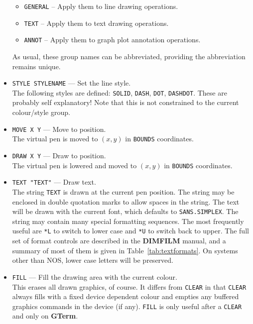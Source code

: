\documentclass[a4paper,twoside,11pt]{article}
\newcommand{\textttc}[1]{\texttt{\textcolor{OurRed}{#1}}}
\begin{document}
\begin{itemize}
\begin{itemize}
	\item \textttc{GENERAL} -- Apply them to line drawing operations.
	\item \textttc{TEXT} -- Apply them to text drawing operations.
	\item \textttc{ANNOT} -- Apply them to graph plot annotation operations.
	\end{itemize}
	As usual, these group names can be abbreviated, providing the abbreviation
	remains unique.
\item \textttc{STYLE STYLENAME} --- Set the line style.\\
   The following styles are defined: \texttt{SOLID}, \texttt{DASH},
   \texttt{DOT}, \texttt{DASHDOT}. These are
   probably self explanatory! Note that this is not constrained to the current
   colour/style group.
\item \textttc{MOVE X Y} --- Move to position.\\
   The virtual pen is moved to $(x,y)$ in \texttt{BOUNDS} coordinates.
\item \textttc{DRAW X Y} --- Draw to position.\\
   The virtual pen is lowered and moved to $(x,y)$ in \texttt{BOUNDS} coordinates.
\item \textttc{TEXT "TEXT"} --- Draw text.\\
   The string \texttt{TEXT} is drawn at the current pen position. The string may be enclosed
   in double quotation marks to allow spaces in the string. The text will be drawn
   with the current font, which defaults to \texttt{SANS.SIMPLEX}. The string may contain many special
   formatting sequences. The most frequently useful are \texttt{*L} to switch to lower case
   and \texttt{*U} to switch back to upper. The full set of format controls are described in
   the \textbf{DIMFILM} manual, and a summary of most of them is given in Table~\ref{tab:textformats}.
   On systems other than NOS, lower case letters will be preserved.
\item \textttc{FILL} --- Fill the drawing area with the current colour.\\
   This erases all drawn graphics, of course. It differs from
   \texttt{CLEAR} in that \texttt{CLEAR} always fills with a fixed
   device dependent colour and empties any buffered graphics commands
   in the device (if any). \texttt{FILL} is only useful after a \texttt{CLEAR} and
   only on \textbf{GTerm}.
\end{itemize}
\end{document}
